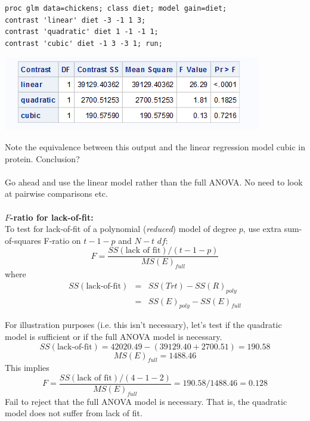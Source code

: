 \begin{small}
\begin{verbatim}
proc glm data=chickens; class diet; model gain=diet;
contrast 'linear' diet -3 -1 1 3;
contrast 'quadratic' diet 1 -1 -1 1;
contrast 'cubic' diet -1 3 -3 1; run;
\end{verbatim}
\end{small}

\begin{center}
\includegraphics[scale=0.8]{ChickensGLM3}
\end{center}

Note the equivalence between this output and the linear regression model cubic in protein.  Conclusion? \\~\\
 Go ahead and use the linear model rather than the full ANOVA.  No need to look at pairwise comparisons etc.\\~\\

\textbf{$F$-ratio for lack-of-fit:}\\ 
To test for lack-of-fit of a polynomial ({\em reduced}) model of degree $p$, use extra sum-of-squares F-ratio on $t-1-p$ and $N-t$ $df$:
$$ F=\frac{SS(\mbox{lack of fit})/(t-1-p)}{MS(E)_{full}}$$
where
\begin{eqnarray*}
SS(\mbox{lack-of-fit})  &=&  SS(Trt)-SS(R)_{poly} \\
&=&  SS(E)_{poly}-SS(E)_{full}
\end{eqnarray*}

For illustration purposes (i.e. this isn't necessary), let's test if the quadratic model is sufficient or if the full ANOVA model is necessary.\\

$$SS(\mbox{lack-of-fit})=42020.49-(39129.40+2700.51)=190.58$$
$$MS(E)_{full}=1488.46$$
This implies
$$F=\frac{SS(\mbox{lack of fit})/(4-1-2)}{MS(E)_{full}}=190.58/1488.46=0.128$$
Fail to reject that the full ANOVA model is necessary.  That is, the quadratic model does not suffer from lack of fit.
